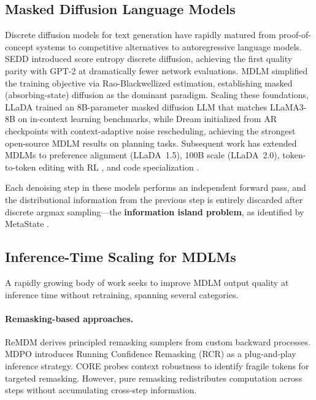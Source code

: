 \documentclass{article}
\begin{document}
\subsection{Masked Diffusion Language Models}

Discrete diffusion models for text generation have rapidly matured from proof-of-concept systems to competitive alternatives to autoregressive language models. SEDD \citep{lou2024sedd} introduced score entropy discrete diffusion, achieving the first quality parity with GPT-2 at dramatically fewer network evaluations. MDLM \citep{sahoo2024mdlm} simplified the training objective via Rao-Blackwellized estimation, establishing masked (absorbing-state) diffusion as the dominant paradigm. Scaling these foundations, LLaDA \citep{nie2025llada} trained an 8B-parameter masked diffusion LLM that matches LLaMA3-8B on in-context learning benchmarks, while Dream \citep{liu2025dream} initialized from AR checkpoints with context-adaptive noise rescheduling, achieving the strongest open-source MDLM results on planning tasks. Subsequent work has extended MDLMs to preference alignment (LLaDA~1.5), 100B scale (LLaDA~2.0), token-to-token editing with RL \citep{chen2026llada21}, and code specialization \citep{dreamcoder2025}.

Each denoising step in these models performs an independent forward pass, and the distributional information from the previous step is entirely discarded after discrete argmax sampling---the \textbf{information island problem}, as identified by MetaState \citep{xia2026metastate}.

\subsection{Inference-Time Scaling for MDLMs}

A rapidly growing body of work seeks to improve MDLM output quality at inference time without retraining, spanning several categories.

\paragraph{Remasking-based approaches.} ReMDM \citep{arriola2025remdm} derives principled remasking samplers from custom backward processes. MDPO \citep{chen2025mdpo} introduces Running Confidence Remasking (RCR) as a plug-and-play inference strategy. CORE \citep{zhai2026core} probes context robustness to identify fragile tokens for targeted remasking. However, pure remasking redistributes computation across steps without accumulating cross-step information.
\end{document}
